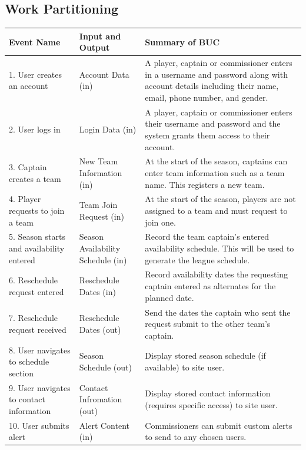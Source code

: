 \documentclass[12pt]{article}
\begin{document}
\subsection{Work Partitioning}
  \begin{center}
    \begin{tabular}{|m{4cm}|m{4cm}|m{6cm}|}
      \hline
      Event Name & Input and Output & Summary of BUC\\
      \hline
      1. User creates an account & Account Data (in) & A player, captain or
      commissioner enters in a username and password along with account details
      including their name, email, phone number, and gender.\\
      2. User logs in & Login Data (in) & A player, captain or commissioner
      enters their username and password and the system grants them access to
      their account.\\
      3. Captain creates a team & New Team Information (in) & At the
      start of the season, captains can enter team information such as a team
      name. This registers a new team.\\
      4. Player requests to join a team & Team Join Request (in) & At the
      start of the season, players are not assigned to a team and must request
      to join one.\\
      5. Season starts and availability entered & Season Availability Schedule
      (in) & Record the team captain's entered availability schedule. This
      will be used to generate the league schedule.\\
      6. Reschedule request entered & Reschedule Dates (in) & Record
      availability dates the requesting captain entered as alternates for the
      planned date.\\
      7. Reschedule request received & Reschedule Dates (out) & Send the dates
      the captain who sent the request submit to the other team's captain.\\
      8. User navigates to schedule section & Season Schedule (out) & Display
      stored season schedule (if available) to site user.\\
      9. User navigates to contact information & Contact Infromation (out) & Display
      stored contact information (requires specific access) to site user.\\
      10. User submits alert & Alert Content (in) & Commissioners can submit custom
      alerts to send to any chosen users.\\
      \hline
    \end{tabular}
  \end{center}
\end{document}

